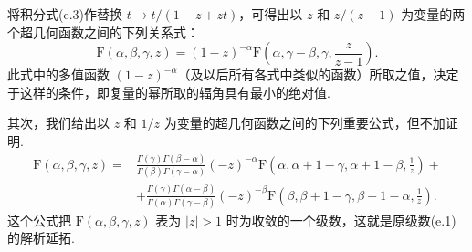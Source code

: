 将积分式(e.3)作替换 $t\to t/(1-z+zt)$，可得出以 $z$ 和 $z/(z-1)$ 为变量的两个超几何函数之间的下列关系式：
\begin{equation}
  \mathrm{F}(\alpha,\beta,\gamma,z)=(1-z)^{-\alpha}
  \mathrm{F}\left(\alpha,\gamma-\beta,\gamma,\frac{z}{z-1}\right).
\end{equation}
此式中的多值函数 $(1-z)^{-\alpha}$（及以后所有各式中类似的函数）所取之值，决定于这样的条件，即复量的幂所取的辐角具有最小的绝对值.

其次，我们给出以 $z$ 和 $1/z$ 为变量的超几何函数之间的下列重要公式，但不加证明.
\begin{equation}
\begin{aligned}
  \mathrm{F}(\alpha,\beta,\gamma,z)={}&\frac{\Gamma(\gamma)\Gamma(\beta-\alpha)}
  {\Gamma(\beta)\Gamma(\gamma-\alpha)}(-z)^{-\alpha}
  \mathrm{F}\left(\alpha,\alpha+1-\gamma,\alpha+1-\beta,\frac{1}{z}\right)+\\
  &+\frac{\Gamma(\gamma)\Gamma(\alpha-\beta)}
  {\Gamma(\alpha)\Gamma(\gamma-\beta)}(-z)^{-\beta}
  \mathrm{F}\left(\beta,\beta+1-\gamma,\beta+1-\alpha,\frac{1}{z}\right).
\end{aligned}
\end{equation}
这个公式把 $\mathrm{F}(\alpha,\beta,\gamma,z)$ 表为 $|z|>1$ 时为收敛的一个级数，这就是原级数(e.1)的解析延拓.


